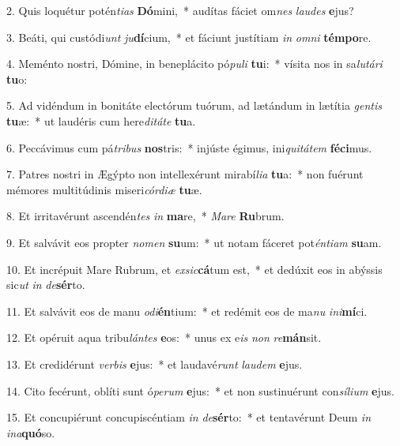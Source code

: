 2. Quis loquétur potén\textit{ti}\textit{as} \textbf{Dó}mini,~*  audítas fáciet om\textit{nes} \textit{lau}\textit{des} \textbf{e}jus?\

3. Beáti, qui custódi\textit{unt} \textit{ju}\textbf{dí}cium,~*  et fáciunt justítiam \textit{in} \textit{om}\textit{ni} \textbf{tém}\textbf{po}re.\

4. Meménto nostri, Dómine, in beneplácito pó\textit{pu}\textit{li} \textbf{tu}i:~*  vísita nos in sa\textit{lu}\textit{tá}\textit{ri} \textbf{tu}o:\

5. Ad vidéndum in bonitáte electórum tuórum, ad lætándum in lætítia \textit{gen}\textit{tis} \textbf{tu}æ:~*  ut laudéris cum here\textit{di}\textit{tá}\textit{te} \textbf{tu}a.\

6. Peccávimus cum pá\textit{tri}\textit{bus} \textbf{nos}tris:~*  injúste égimus, ini\textit{qui}\textit{tá}\textit{tem} \textbf{fé}\textbf{ci}mus.\

7. Patres nostri in Ægýpto non intellexérunt mirabí\textit{li}\textit{a} \textbf{tu}a:~*  non fuérunt mémores multitúdinis miseri\textit{cór}\textit{di}\textit{æ} \textbf{tu}æ.\

8. Et irritavérunt ascendén\textit{tes} \textit{in} \textbf{ma}re,~*  \textit{Ma}\textit{re} \textbf{Ru}brum.\

9. Et salvávit eos propter \textit{no}\textit{men} \textbf{su}um:~*  ut notam fáceret pot\textit{én}\textit{ti}\textit{am} \textbf{su}am.\

10. Et incrépuit Mare Rubrum, et \textit{ex}\textit{sic}\textbf{cá}tum est,~*  et dedúxit eos in abýssis sic\textit{ut} \textit{in} \textit{de}\textbf{sér}to.\

11. Et salvávit eos de manu \textit{o}\textit{di}\textbf{én}tium:~*  et redémit eos de ma\textit{nu} \textit{in}\textit{i}\textbf{mí}ci.\

12. Et opéruit aqua tribu\textit{lán}\textit{tes} \textbf{e}os:~*  unus ex e\textit{is} \textit{non} \textit{re}\textbf{mán}sit.\

13. Et credidérunt \textit{ver}\textit{bis} \textbf{e}jus:~*  et laudavé\textit{runt} \textit{lau}\textit{dem} \textbf{e}jus.\

14. Cito fecérunt, oblíti sunt ó\textit{pe}\textit{rum} \textbf{e}jus:~*  et non sustinuérunt con\textit{sí}\textit{li}\textit{um} \textbf{e}jus.\

15. Et concupiérunt concupiscéntiam \textit{in} \textit{de}\textbf{sér}to:~*  et tentavérunt Deum \textit{in} \textit{in}\textit{a}\textbf{quó}so.\

